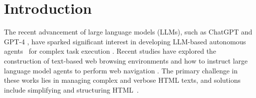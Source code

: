 \documentclass[11pt]{article}
\begin{document}
\section{Introduction}


The recent advancement of large language models (LLMs), such as ChatGPT and GPT-4 \citep{openai2023gpt4}, have sparked significant interest in developing LLM-based autonomous agents~\citep{Significant_Gravitas_AutoGPT} for complex task execution \citep{qin2023toolllm, schick2023toolformer}. %
Recent studies have explored the construction of text-based web browsing environments and how to instruct large language model agents to perform web navigation \citep{nakano2021webgpt, gur2023real, zhou2023webarena, lu2023chameleon}. The primary challenge in these works lies in managing complex and verbose HTML texts, and solutions include simplifying and structuring HTML~\citep{nakano2021webgpt, zhou2023webarena,gur2023real,deng2023mind2web}.
\end{document}
